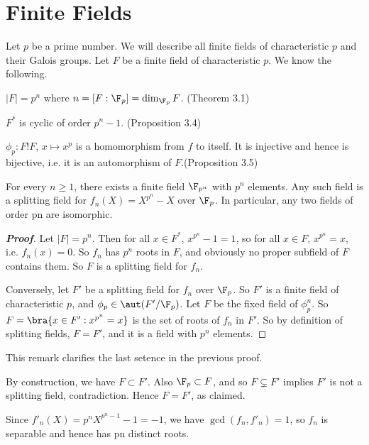 \section{Finite Fields}

Let $p$ be a prime number. We will describe all finite fields of characteristic $p$ and their Galois groups. Let $F$ be a finite field of characteristic $p$. We know the following.
\bit
\item $|F| = p^n$ where $n = [F : \F_p] = \dim_{\F_p} F$. (Theorem 3.1)
\item $F^*$ is cyclic of order $p^n - 1$. (Proposition 3.4)
\item $\phi_p : F ! F$, $x \mapsto x^p$ is a homomorphism from $f$ to itself. It is injective and hence is bijective, i.e. it is an automorphism of $F$.(Proposition 3.5)
\eit

\begin{theorem}
For every $n \geq 1$, there exists a finite field $\F_{p^n}$ with $p^n$ elements. Any such field is a splitting field for $f_n(X) = X^{p^n} -X$ over $\F_p$. In particular, any two fields of order pn are isomorphic.
\end{theorem}

\begin{proof}[\bf Proof]
Let $|F| = p^n$. Then for all $x \in F^*$, $x^{p^n}-1 = 1$, so for all $x \in F$, $x^{p^n}= x$, i.e. $f_n(x) = 0$. So $f_n$ has $p^n$ roots in $F$, and obviously no proper subfield of $F$ contains them. So $F$ is a splitting field for $f_n$.

Conversely, let $F'$ be a splitting field for $f_n$ over $\F_p$. So $F'$ is a finite field of characteristic $p$, and $\phi_p \in \aut(F'/\F_p)$. Let $F$ be the fixed field of $\phi^n_p$. So $F = \bra{x \in F' : x^{p^n} = x}$ is the set of roots of $f_n$ in $F'$. So by definition of splitting fields, $F = F'$, and it is a field with $p^n$ elements. 
\end{proof}

\begin{remark}
This remark clarifies the last setence in the previous proof.
\bit
\item By construction, we have $F \subset F'$. Also $\F_p \subset F$, and so $F \subsetneq F'$ implies $F'$ is not a splitting field, contradiction. Hence $F = F'$, as claimed.
\item Since $f'_n (X) = p^nX^{p^n-1} -1 = -1$, we have $\gcd(f_n, f'_n) = 1$, so $f_n$ is separable and hence has pn distinct roots.
\eit
\end{remark}


